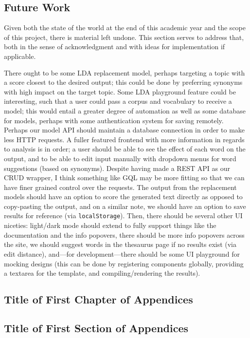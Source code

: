 \documentclass[11pt, twoside, reqno]{book}
\begin{document}
\section{Future Work}

Given both the state of the world at the end of this academic year and the scope of this project, there is material left undone. This section serves to address that, both in the sense of acknowledgment and with ideas for implementation if applicable.

There ought to be some LDA replacement model, perhaps targeting a topic with a score closest to the desired output; this could be done by preferring synonyms with high impact on the target topic. Some LDA playground feature could be interesting, such that a user could pass a corpus and vocabulary to receive a model; this would entail a greater degree of automation as well as some database for models, perhaps with some authentication system for saving remotely. Perhaps our model API should maintain a database connection in order to make less HTTP requests. A fuller featured frontend with more information in regards to analysis is in order; a user should be able to see the effect of each word on the output, and to be able to edit input manually with dropdown menus for word suggestions (based on synonyms). Despite having made a REST API as our CRUD wrapper, I think something like GQL may be more fitting so that we can have finer grained control over the requests. The output from the replacement models should have an option to score the generated text directly as opposed to copy-pasting the output, and on a similar note, we should have an option to save results for reference (via \texttt{localStorage}). Then, there should be several other UI niceties: light/dark mode should extend to fully support things like the documentation and the info popovers, there should be more info popovers across the site, we should suggest words in the thesaurus page if no results exist (via edit distance), and—for development—there should be some UI playground for mocking designs (this can be done by registering components globally, providing a textarea for the template, and compiling/rendering the results).






\begin{appendices}
\chapter{Title of First Chapter of Appendices}
\label{label}

\section{Title of First Section of Appendices}
\label{label}


\end{appendices}

\nocite{*}


\end{document}
